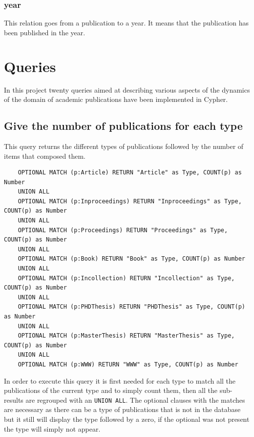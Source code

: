 \documentclass{article}
\begin{document}
\subsubsection{year}
This relation goes from a publication to a year. It means that the publication has been published in the year.

\begin{center}
\end{center}

\section{Queries}
In this project twenty queries aimed at describing various aspects of the dynamics of the domain of academic publications have been implemented in Cypher.


\subsection{Give the number of publications for each type}
This query returns the different types of publications followed by the number of items that composed them.

\begin{lstlisting}
    OPTIONAL MATCH (p:Article) RETURN "Article" as Type, COUNT(p) as Number
    UNION ALL
    OPTIONAL MATCH (p:Inproceedings) RETURN "Inproceedings" as Type, COUNT(p) as Number
    UNION ALL
    OPTIONAL MATCH (p:Proceedings) RETURN "Proceedings" as Type, COUNT(p) as Number
    UNION ALL
    OPTIONAL MATCH (p:Book) RETURN "Book" as Type, COUNT(p) as Number
    UNION ALL
    OPTIONAL MATCH (p:Incollection) RETURN "Incollection" as Type, COUNT(p) as Number
    UNION ALL
    OPTIONAL MATCH (p:PHDThesis) RETURN "PHDThesis" as Type, COUNT(p) as Number
    UNION ALL
    OPTIONAL MATCH (p:MasterThesis) RETURN "MasterThesis" as Type, COUNT(p) as Number
    UNION ALL
    OPTIONAL MATCH (p:WWW) RETURN "WWW" as Type, COUNT(p) as Number
\end{lstlisting}

In order to execute this query it is first needed for each type to match all the publications of the current type and to simply count them, then all the sub-results are regrouped with an \texttt{UNION ALL}. The optional clauses with the matches are necessary as there can be a type of publications that is not in the database but it still will display the type followed by a zero, if the optional was not present the type will simply not appear.
\end{document}
